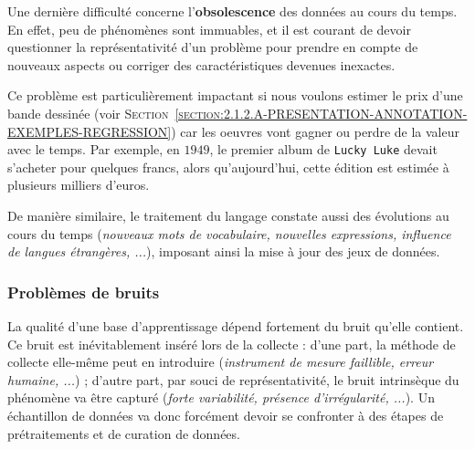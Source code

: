 			Une dernière difficulté concerne l'\textbf{obsolescence} des données au cours du temps.
			En effet, peu de phénomènes sont immuables, et il est courant de devoir questionner la représentativité d'un problème pour prendre en compte de nouveaux aspects ou corriger des caractéristiques devenues inexactes.
			\begin{leftBarExamples}
				Ce problème est particulièrement impactant si nous voulons estimer le prix d'une bande dessinée (voir \textsc{Section~\ref{section:2.1.2.A-PRESENTATION-ANNOTATION-EXEMPLES-REGRESSION}}) car les oeuvres vont gagner ou perdre de la valeur avec le temps.
				Par exemple, en $1949$, le premier album de \texttt{Lucky Luke} devait s'acheter pour quelques francs, alors qu'aujourd'hui, cette édition est estimée à plusieurs milliers d'euros.
				
				De manière similaire, le traitement du langage constate aussi des évolutions au cours du temps (\textit{nouveaux mots de vocabulaire, nouvelles expressions, influence de langues étrangères, ...}), imposant ainsi la mise à jour des jeux de données.
			\end{leftBarExamples}
		
		
		\subsubsection{Problèmes de bruits}
		\label{section:2.3.1.B-DEFIS-ANNOTATION-ASPECT-DONNEES-BRUITS}
		
			La qualité d'une base d'apprentissage dépend fortement du bruit qu'elle contient.
			Ce bruit est inévitablement inséré lors de la collecte :
			d'une part, la méthode de collecte elle-même peut en introduire (\textit{instrument de mesure faillible, erreur humaine, ...}) ;
			d'autre part, par souci de représentativité, le bruit intrinsèque du phénomène va être capturé (\textit{forte variabilité, présence d'irrégularité, ...}).
			Un échantillon de données va donc forcément devoir se confronter à des étapes de prétraitements et de curation de données.

